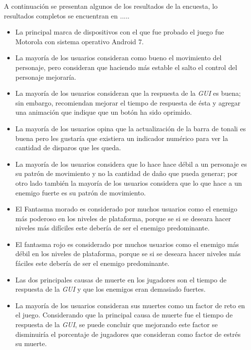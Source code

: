 A continuación se presentan algunos de los resultados de la encuesta, 
lo resultados completos se encuentran en ..... 
\begin{itemize} %
        \item La principal marca de dispositivos con el que fue probado el juego fue
        Motorola con sistema operativo Android 7.
        \item La mayoría de los usuarios consideran como bueno el movimiento del
        personaje, pero consideran que haciendo más estable el salto el control del
        personaje mejoraría.
        \item La mayoría de los usuarios consideran que la respuesta de la
        \textit{GUI} es buena; sin embargo, recomiendan mejorar el tiempo de respuesta
        de ésta y agregar una animación que indique que un botón ha sido oprimido.
        \item La mayoría de los usuarios opina que la actualización de la barra de
        tonali es buena pero les gustaría que existiera un indicador numérico para ver
        la cantidad de disparos que les queda.
        \item La mayoría de los usuarios considera que lo hace hace débil a un personaje
        es su patrón de movimiento y no la cantidad de daño que pueda generar; por
        otro lado también la mayoría de los usuarios considera que lo que hace a un
        enemigo fuerte es su patrón de movimiento.
        \item El Fantasma morado es considerado por muchos usuarios como el enemigo más
        poderoso en los niveles de plataforma, porque se si se deseara hacer niveles
        más difíciles este debería de ser el enemigo predominante.
        \item El fantasma rojo es considerado por muchos usuarios como el enemigo más
        débil en los niveles de plataforma, porque se si se deseara hacer niveles
        más fáciles este debería de ser el enemigo predominante.
        \item Las dos principales causas de muerte en los jugadores son el tiempo
        de respuesta de la \textit{GUI} y que los enemigos eran demasiado fuertes.
        \item La mayoría de los usuarios consideran sus muertes como un factor de reto
        en el juego. Considerando que la principal causa de muerte fue el tiempo de
        respuesta de la \textit{GUI}, se puede concluir que mejorando este factor se
        disminuiría el porcentaje de jugadores que consideran como factor de estrés su
        muerte.
\end{itemize}

